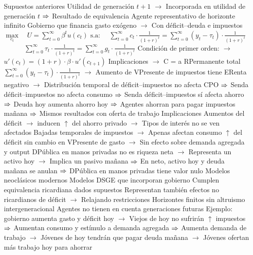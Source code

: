\documentclass{nuevotema}
\begin{document}
\begin{esquemal}
				\4[] Supuestos anteriores
				\4[] Utilidad de generación $t+1$
				\4[] $\to$ Incorporada en utilidad de generación $t$
				\4[] $\Rightarrow$ Resultado de equivalencia
				\4[] Agente representativo de horizonte infinito
				\4[] Gobierno que financia gasto exógeno
				\4[] $\to$ Con déficit--deuda e impuestos
				\4[] $\underset{c_t}{\max} \quad U = \sum_{t=0}^{\infty} \beta^t u(c_t)$
				\4[] $\text{s.a}: \, \quad \sum_{t=0}^\infty c_t \cdot \frac{1}{(1+r)^t} = \sum_{t=0}^\infty (y_t - \tau_t) \cdot \frac{1}{(1+r)^t} $
				\4[] $\quad \quad \quad \sum_{t=0}^\infty \tau_t \cdot \frac{1}{(1+r)^t} = \sum_{t=0}^\infty g_t \cdot \frac{1}{(1+r)^t}$
				\4[] Condición de primer orden:
				\4[] $\to$ $u'(c_t) = (1+r) \cdot \beta \cdot u'(c_{t+1})$
				\4[] Implicaciones
				\4[] $\to$ C = a RPermanente total $\sum_{t=0}^\infty (y_t - \tau_t) \cdot \frac{1}{(1+r)^t} $
				\4[] $\to$ Aumento de VPresente de impuestos tiene ERenta negativo
				\4[] $\to$ Distribución temporal de déficit--impuestos no afecta CPO
				\4[] $\Rightarrow$ Senda déficit--impuestos no afecta consumo
				\4[] $\Rightarrow$ Senda déficit--impuestos sí afecta ahorro
				\4[] $\Rightarrow$ Deuda hoy aumenta ahorro hoy
				\4[] $\Rightarrow$ Agentes ahorran para pagar impuestos mañana
				\4[] $\Rightarrow$ Mismos resultados con oferta de trabajo
				\4 Implicaciones
				\4[] Aumentos del déficit
				\4[] $\to$ inducen $\uparrow$ del ahorro privado
				\4[] $\to$ Tipos de interés no se ven afectados
				\4[] Bajadas temporales de impuestos
				\4[] $\to$ Apenas afectan consumo
				\4[] $\uparrow$ del déficit sin cambio en VPresente de gasto
				\4[] $\to$ Sin efecto sobre demanda agregada y output
				\4[] DPública en manos privadas no es riqueza neta
				\4[] $\to$ Representa un activo hoy
				\4[] $\to$ Implica un pasivo mañana
				\4[] $\Rightarrow$ En neto, activo hoy y deuda mañana se anulan
				\4[] $\Rightarrow$ DPública en manos privadas tiene valor nulo
			\3 Modelos neoclásicos modernos
				\4 Modelos DSGE que incorporan gobierno
				\4[] Cumplen equivalencia ricardiana dados supuestos
				\4[] Representan también efectos no ricardianos de déficit
				\4[] $\to$ Relajando restricciones
				\4 Horizontes finitos sin altruismo intergeneracional
				\4[] Agentes no tienen en cuenta generaciones futuras
				\4[] Ejemplo: gobierno aumenta gasto y déficit hoy
				\4[] $\to$ Viejos de hoy no sufrirán $\uparrow$ impuestos
				\4[] $\Rightarrow$ Aumentan consumo y estímulo a demanda agregada
				\4[] $\Rightarrow$ Aumenta demanda de trabajo
				\4[] $\to$ Jóvenes de hoy tendrán que pagar deuda mañana
				\4[] $\to$ Jóvenes ofertan más trabajo hoy para ahorrar

\end{esquemal}
\end{document}
